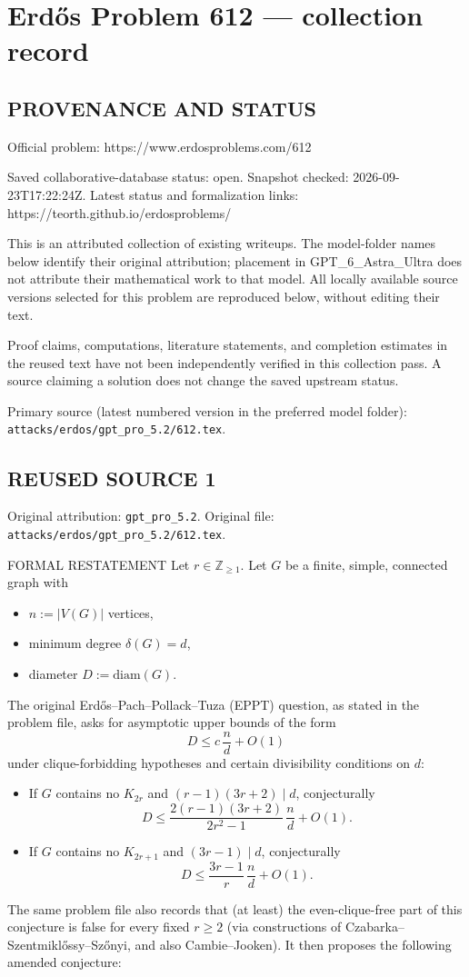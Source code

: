 \section*{Erd\H{o}s Problem 612 --- collection record}

\subsection*{PROVENANCE AND STATUS}
Official problem: https://www.erdosproblems.com/612

Saved collaborative-database status: open.
Snapshot checked: 2026-09-23T17:22:24Z.
Latest status and formalization links: https://teorth.github.io/erdosproblems/

This is an attributed collection of existing writeups. The model-folder names below identify their original attribution; placement in GPT\_6\_Astra\_Ultra does not attribute their mathematical work to that model. All locally available source versions selected for this problem are reproduced below, without editing their text.

Proof claims, computations, literature statements, and completion estimates in the reused text have not been independently verified in this collection pass. A source claiming a solution does not change the saved upstream status.

Primary source (latest numbered version in the preferred model folder): \texttt{attacks/erdos/gpt\_pro\_5.2/612.tex}.

\subsection*{REUSED SOURCE 1}
Original attribution: \texttt{gpt\_pro\_5.2}.
Original file: \texttt{attacks/erdos/gpt\_pro\_5.2/612.tex}.


FORMAL RESTATEMENT
Let $r\in\mathbb{Z}_{\ge 1}$. Let $G$ be a finite, simple, connected graph with
\begin{itemize}
\item $n:=|V(G)|$ vertices,
\item minimum degree $\delta(G)=d$,
\item diameter $D:=\mathrm{diam}(G)$.
\end{itemize}
The original Erd\H{o}s--Pach--Pollack--Tuza (EPPT) question, as stated in the
problem file, asks for asymptotic upper bounds of the form
\[
D \le c\,\frac{n}{d} + O(1)
\]
under clique-forbidding hypotheses and certain divisibility conditions on $d$:
\begin{itemize}
\item If $G$ contains no $K_{2r}$ and $(r-1)(3r+2)\mid d$, conjecturally
\[
D \le \frac{2(r-1)(3r+2)}{2r^2-1}\,\frac{n}{d}+O(1).
\]
\item If $G$ contains no $K_{2r+1}$ and $(3r-1)\mid d$, conjecturally
\[
D \le \frac{3r-1}{r}\,\frac{n}{d}+O(1).
\]
\end{itemize}
The same problem file also records that (at least) the even-clique-free part of
this conjecture is false for every fixed $r\ge 2$ (via constructions of
Czabarka--Szentmikl\H{o}ssy--Sz\H{o}nyi, and also Cambie--Jooken).
It then proposes the following amended conjecture:

